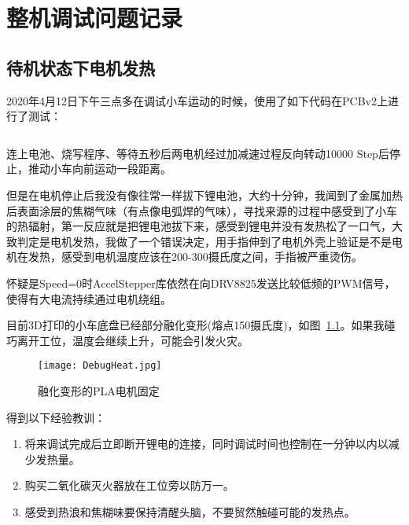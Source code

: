 \chapter{整机调试问题记录}
\label{cha:Debug}

\section{待机状态下电机发热}

2020年4月12日下午三点多在调试小车运动的时候，使用了如下代码在PCBv2上进行了测试：

\inputminted[mathescape, linenos, breaklines]{c}{Code/Stepper-3-Movement/Stepper-3-Movement.ino}

连上电池、烧写程序、等待五秒后两电机经过加减速过程反向转动10000 Step后停止，推动小车向前运动一段距离。

但是在电机停止后我没有像往常一样拔下锂电池，大约十分钟，我闻到了金属加热后表面涂层的焦糊气味（有点像电弧焊的气味），寻找来源的过程中感受到了小车的热辐射，第一反应就是把锂电池拔下来，感受到锂电并没有发热松了一口气，大致判定是电机发热，我做了一个错误决定，用手指伸到了电机外壳上验证是不是电机在发热，感受到电机温度应该在200-300摄氏度之间，手指被严重烫伤。

怀疑是Speed=0时AccelStepper库依然在向DRV8825发送比较低频的PWM信号，使得有大电流持续通过电机绕组。

目前3D打印的小车底盘已经部分融化变形(熔点150摄氏度)，如图~\ref{fig:DebugHeat}。如果我碰巧离开工位，温度会继续上升，可能会引发火灾。

\begin{figure}[htbp]
    \centering
    \texttt{[image: DebugHeat.jpg]}
    \caption{融化变形的PLA电机固定}
    \label{fig:DebugHeat}
\end{figure}

得到以下经验教训：

\begin{enumerate}
    \item 将来调试完成后立即断开锂电的连接，同时调试时间也控制在一分钟以内以减少发热量。
    \item 购买二氧化碳灭火器放在工位旁以防万一。
    \item 感受到热浪和焦糊味要保持清醒头脑，不要贸然触碰可能的发热点。
\end{enumerate}
